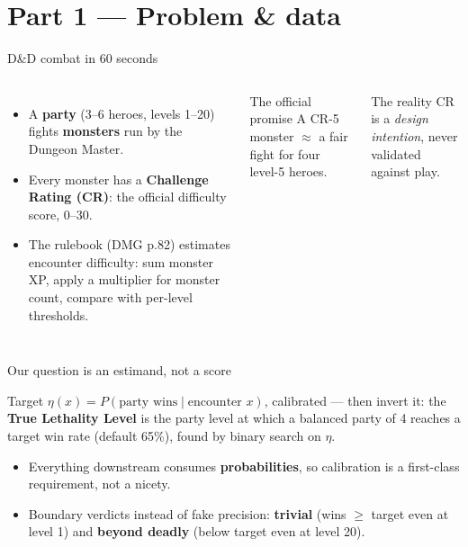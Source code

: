 \documentclass[aspectratio=169,11pt]{beamer}
\begin{document}
\section{Part 1 — Problem \& data}

\begin{frame}{D\&D combat in 60 seconds}
  \begin{columns}[T]
      \begin{itemize}
        \item A \textbf{party} (3–6 heroes, levels 1–20) fights \textbf{monsters} run by the Dungeon Master.
        \item Every monster has a \textbf{Challenge Rating (CR)}: the official difficulty score, 0–30.
        \item The rulebook (DMG p.82) estimates encounter difficulty: sum monster XP, apply a multiplier for monster count, compare with per-level thresholds.
      \end{itemize}
      \begin{block}{The official promise}
        A CR-5 monster $\approx$ a fair fight for four level-5 heroes.
      \end{block}
      \begin{block}{The reality}
        CR is a \emph{design intention}, never validated against play.
      \end{block}
  \end{columns}
\end{frame}

\begin{frame}{Our question is an estimand, not a score}
  \begin{block}{Target}
    $\eta(x) = P(\text{party wins} \mid \text{encounter } x)$, calibrated — then invert it:
    the \textbf{True Lethality Level} is the party level at which a balanced party of 4
    reaches a target win rate (default 65\%), found by binary search on $\eta$.
  \end{block}
  \begin{itemize}
    \item Everything downstream consumes \textbf{probabilities}, so calibration is a first-class requirement, not a nicety.
    \item Boundary verdicts instead of fake precision: \textcolor{okGreen}{\textbf{trivial}} (wins $\geq$ target even at level 1) and \textcolor{warnRed}{\textbf{beyond deadly}} (below target even at level 20).
  \end{itemize}
\end{frame}
\end{document}
